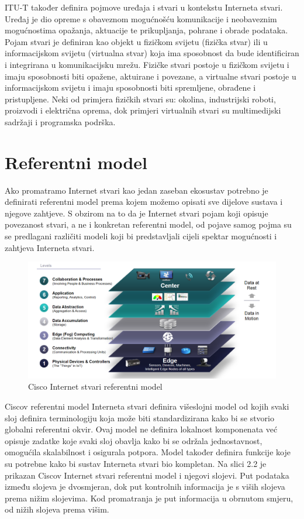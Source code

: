 \documentclass[times, utf8, diplomski]{fer}
\begin{document}
ITU-T također definira pojmove uređaja i stvari u kontekstu Interneta stvari. Uređaj je dio opreme s obaveznom mogućnošću komunikacije i neobaveznim mogućnostima opažanja, aktuacije te prikupljanja, pohrane i obrade podataka. Pojam stvari je definiran kao objekt u fizičkom svijetu (fizička stvar) ili u informacijskom svijetu (virtualna stvar) koja ima sposobnost da bude identificiran i integrirana u komunikacijsku mrežu. Fizičke stvari postoje u fizičkom svijetu i imaju sposobnosti biti opažene, aktuirane i povezane, a virtualne stvari postoje u informacijskom svijetu i imaju sposobnosti biti spremljene, obrađene i pristupljene. Neki od primjera fizičkih stvari su: okolina, industrijski roboti, proizvodi i električna oprema, dok primjeri virtualnih stvari su multimedijski sadržaji i programska podrška.

\section{Referentni model}
Ako promatramo Internet stvari kao jedan zaseban ekosustav potrebno je definirati referentni model prema kojem možemo opisati sve dijelove sustava i njegove zahtjeve. S obzirom na to da je Internet stvari pojam koji opisuje povezanost stvari, a ne i konkretan referentni model, od pojave samog pojma su se predlagani različiti modeli koji bi predstavljali cijeli spektar mogućnosti i zahtjeva Interneta stvari. 
\begin{figure}[htb]
    \centering
    \includegraphics[width=14cm]{images/ciscomodel.png}
    \caption{Cisco Internet stvari referentni model\citep{CiscoIotModel}}
    \label{fig:ciscomodel}
\end{figure}

Ciscov referentni model Interneta stvari\citep{CiscoIotModel} definira višeslojni model od kojih svaki sloj definira terminologiju koja može biti standardizirana kako bi se stvorio globalni referentni okvir. Ovaj model ne definira lokalnost komponenata već opisuje zadatke koje svaki sloj obavlja kako bi se održala jednostavnost, omogućila skalabilnost i osigurala potpora. Model također definira funkcije koje su potrebne kako bi sustav Interneta stvari bio kompletan. Na slici 2.2 je prikazan Ciscov Internet stvari referentni model i njegovi slojevi. Put podataka između slojeva je dvosmjeran, dok put kontrolnih informacija je s viših slojeva prema nižim slojevima. Kod promatranja je put informacija u obrnutom smjeru, od nižih slojeva prema višim. 
\end{document}
